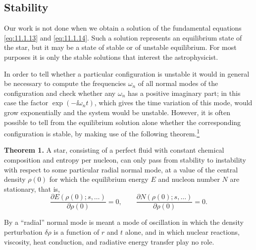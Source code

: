 
\subsection{Stability}\label{sec:11.2}

Our work is not done when we obtain a solution of the fundamental equations
\eqref{eq:11.1.13} and \eqref{eq:11.1.14}. Such a solution represents an
equilibrium state of the star, but it may be a state of stable or of unstable
equilibrium. For most purposes it is only the stable solutions that interest
the astrophysicist.

In order to tell whether a particular configuration is unstable it would in
general be necessary to compute the frequencies \(\omega_n\) of all normal
modes of the configuration and check whether any \(\omega_n\) has a positive
imaginary part; in this case the factor \(\exp(-\ii\omega_nt)\), which gives the
time variation of this mode, would grow exponentially and the system would be
unstable. However, it is often possible to tell from the equilibrium solution
alone whether the corresponding configuration is stable, by making use of the
following theorem.\hyperref[ch11-ref-1]{\textsuperscript{1}}

\medskip
\noindent\textbf{Theorem 1.}
A star, consisting of a perfect fluid with constant chemical composition and
entropy per nucleon, can only pass from stability to instability with respect
to some particular radial normal mode, at a value of the central density
\(\rho(0)\) for which the equilibrium energy \(E\) and nucleon number \(N\)
are stationary, that is,
\[
  \frac{\partial E(\rho(0);s,\ldots)}{\partial\rho(0)}=0,
  \qquad
  \frac{\partial N(\rho(0);s,\ldots)}{\partial\rho(0)}=0.
\]
\medskip

By a ``radial'' normal mode is meant a mode of oscillation in which the density
perturbation \(\delta\rho\) is a function of \(r\) and \(t\) alone, and in
which nuclear reactions, viscosity, heat conduction, and radiative energy
transfer play no role.

